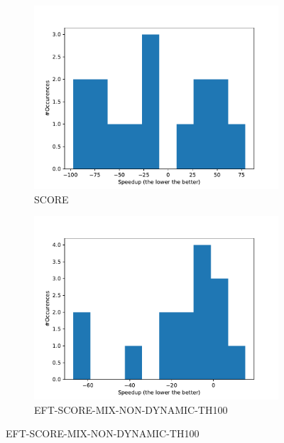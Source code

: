 \documentclass[a4paper]{article}
\begin{document}
\begin{figure}[H]\centering
\begin{subfigure}[b]{0.4\linewidth}\centering\includegraphics[width=1\linewidth]{MBSS/plot/Distribution/Stretch/Stretch_all_workloads_SCORE.pdf}\caption{SCORE}\end{subfigure}
\begin{subfigure}[b]{0.4\linewidth}\centering\includegraphics[width=1\linewidth]{MBSS/plot/Distribution/Stretch/Stretch_all_workloads_EFT-SCORE-MIX-NON-DYNAMIC-TH100.pdf}\caption{EFT-SCORE-MIX-NON-DYNAMIC-TH100}\end{subfigure}

\end{figure}
\end{document}
